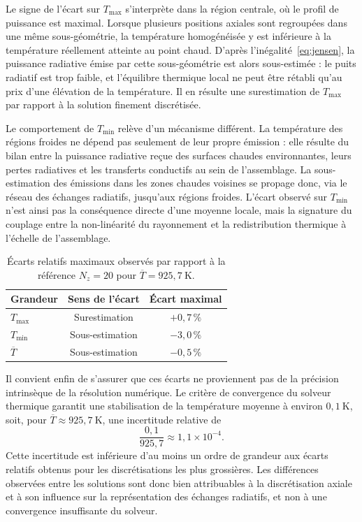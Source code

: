 Le signe de l'écart sur $T_{\max}$ s'interprète dans la région centrale, où le profil de puissance est maximal. Lorsque plusieurs positions axiales sont regroupées dans une même sous-géométrie, la température homogénéisée y est inférieure à la température réellement atteinte au point chaud. D'après l'inégalité~\eqref{eq:jensen}, la puissance radiative émise par cette sous-géométrie est alors sous-estimée : le puits radiatif est trop faible, et l'équilibre thermique local ne peut être rétabli qu'au prix d'une élévation de la température. Il en résulte une surestimation de $T_{\max}$ par rapport à la solution finement discrétisée.

Le comportement de $T_{\min}$ relève d'un mécanisme différent. La température des régions froides ne dépend pas seulement de leur propre émission : elle résulte du bilan entre la puissance radiative reçue des surfaces chaudes environnantes, leurs pertes radiatives et les transferts conductifs au sein de l'assemblage. La sous-estimation des émissions dans les zones chaudes voisines se propage donc, via le réseau des échanges radiatifs, jusqu'aux régions froides. L'écart observé sur $T_{\min}$ n'est ainsi pas la conséquence directe d'une moyenne locale, mais la signature du couplage entre la non-linéarité du rayonnement et la redistribution thermique à l'échelle de l'assemblage.

\begin{table}[H]
\centering
\caption{Écarts relatifs maximaux observés par rapport à la référence $N_z=20$ pour $\overline{T}=925{,}7~\mathrm{K}$.}
\label{tab:ecarts_discretisation_axiale}
\begin{tabular}{lcc}
\hline
Grandeur & Sens de l'écart & Écart maximal \\
\hline
$T_{\max}$ & Surestimation & $+0{,}7\,\%$ \\
$T_{\min}$ & Sous-estimation & $-3{,}0\,\%$ \\
$\overline{T}$ & Sous-estimation & $-0{,}5\,\%$ \\
\hline
\end{tabular}
\end{table}

Il convient enfin de s'assurer que ces écarts ne proviennent pas de la précision intrinsèque de la résolution numérique. Le critère de convergence du solveur thermique garantit une stabilisation de la température moyenne à environ $0{,}1~\mathrm{K}$, soit, pour $\overline{T}\approx925{,}7~\mathrm{K}$, une incertitude relative de
\begin{equation}
\frac{0{,}1}{925{,}7} \approx 1{,}1\times10^{-4}.
\end{equation}
Cette incertitude est inférieure d'au moins un ordre de grandeur aux écarts relatifs obtenus pour les discrétisations les plus grossières. Les différences observées entre les solutions sont donc bien attribuables à la discrétisation axiale et à son influence sur la représentation des échanges radiatifs, et non à une convergence insuffisante du solveur.

